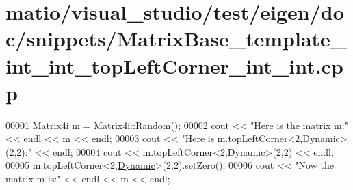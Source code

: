 \hypertarget{matio_2visual__studio_2test_2eigen_2doc_2snippets_2_matrix_base__template__int__int__top_left_corner__int__int_8cpp_source}{}\section{matio/visual\+\_\+studio/test/eigen/doc/snippets/\+Matrix\+Base\+\_\+template\+\_\+int\+\_\+int\+\_\+top\+Left\+Corner\+\_\+int\+\_\+int.cpp}
\label{matio_2visual__studio_2test_2eigen_2doc_2snippets_2_matrix_base__template__int__int__top_left_corner__int__int_8cpp_source}

\begin{DoxyCode}
00001 Matrix4i m = Matrix4i::Random();
00002 cout << \textcolor{stringliteral}{"Here is the matrix m:"} << endl << m << endl;
00003 cout << \textcolor{stringliteral}{"Here is m.topLeftCorner<2,Dynamic>(2,2):"} << endl;
00004 cout << m.topLeftCorner<2,\hyperlink{namespace_eigen_ad81fa7195215a0ce30017dfac309f0b2}{Dynamic}>(2,2) << endl;
00005 m.topLeftCorner<2,\hyperlink{namespace_eigen_ad81fa7195215a0ce30017dfac309f0b2}{Dynamic}>(2,2).setZero();
00006 cout << \textcolor{stringliteral}{"Now the matrix m is:"} << endl << m << endl;
\end{DoxyCode}
